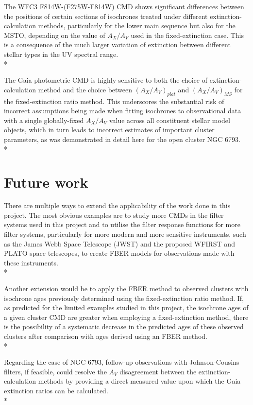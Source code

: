 \documentclass[12pt, a4paper]{report}
\begin{document}
The WFC3 F814W-(F275W-F814W) CMD shows significant differences between the positions of certain sections of isochrones treated under different extinction-calculation methods, particularly for the lower main sequence but also for the MSTO, depending on the value of $A_{X}/A_{V}$ used in the fixed-extinction case. This is a consequence of the much larger variation of extinction between different stellar types in the UV spectral range.\\*

The Gaia photometric CMD is highly sensitive to both the choice of extinction-calculation method and the choice between $(A_{X}/A_{V})_{plat}$ and $(A_{X}/A_{V})_{MS}$ for the fixed-extinction ratio method. This underscores the substantial risk of incorrect assumptions being made when fitting isochrones to observational data with a single globally-fixed $A_{X}/A_{V}$ value across all constituent stellar model objects, which in turn leads to incorrect estimates of important cluster parameters, as was demonstrated in detail here for the open cluster NGC 6793. \\*

\section{Future work}
There are multiple ways to extend the applicability of the work done in this project. The most obvious examples are to study more CMDs in the filter systems used in this project and to utilise the filter response functions for more filter systems, particularly for more modern and more sensitive instruments, such as the James Webb Space Telescope (JWST) and the proposed WFIRST and PLATO space telescopes, to create FBER models for observations made with these instruments.\\*

Another extension would be to apply the FBER method to observed clusters with isochrone ages previously determined using the fixed-extinction ratio method. If, as predicted for the limited examples studied in this project, the isochrone ages of a given cluster CMD are greater when employing a fixed-extinction method, there is the possibility of a systematic decrease in the predicted ages of these observed clusters after comparison with ages derived using an FBER method.\\*

Regarding the case of NGC 6793, follow-up observations with Johnson-Cousins filters, if feasible, could resolve the $A_{V}$ disagreement between the extinction-calculation methods by providing a direct measured value upon which the Gaia extinction ratios can be calculated.\\*
\end{document}
